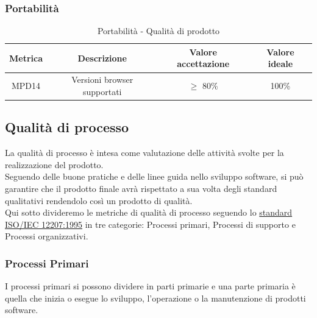 \documentclass[10pt]{article}
\begin{document}
\begin{justify}
\subsubsection{Portabilità}
\begin{table}[H]
  \centering
\begin{tabular}{|c|c|c|c|}
  \hline
  \textbf{Metrica} & \textbf{Descrizione} & \textbf{Valore accettazione} & \textbf{Valore ideale}\\
  \hline
  MPD14 & Versioni browser supportati & $\geq$ 80\% & 100\% \\
  \hline
\end{tabular}
\caption{Portabilità - Qualità di prodotto}
\label{tab:portabilità}
\end{table}


\subsection{Qualità di processo}
La qualità di processo è intesa come valutazione delle attività svolte per la realizzazione del prodotto.\\
Seguendo delle buone pratiche e delle linee guida nello sviluppo software, si può garantire che il prodotto finale avrà rispettato a sua volta degli standard qualitativi rendendolo così un prodotto di qualità.\\
Qui sotto divideremo le metriche di qualità di processo seguendo lo \hyperref[ISO 12207:1995]{standard ISO/IEC 12207:1995} in tre categorie: Processi primari, Processi di supporto e Processi organizzativi.\\
\subsubsection{Processi Primari}
I processi primari si possono dividere in parti primarie e una parte primaria è quella che inizia o esegue lo sviluppo, l'operazione o la manutenzione di prodotti software.\\


\end{justify}
\end{document}
